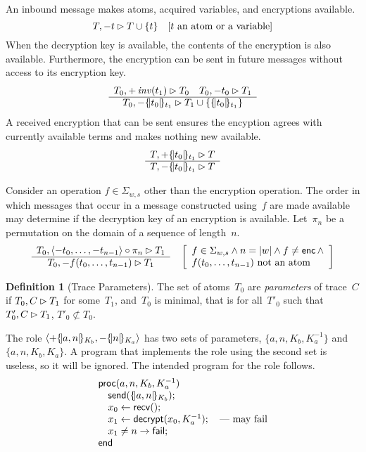 \documentclass[12pt]{article}
\theoremstyle{definition}
\newtheorem{defn}{Definition}[section]
\begin{document}
An inbound message makes atoms, acquired variables, and
encryptions available.
$$T,-t\rhd T\cup\{t\}\quad [\mbox{$t$ an atom or a variable}]$$
When the decryption key is available, the contents of the encryption
is also available.  Furthermore, the encryption can be sent in future
messages without access to its encryption key.
$$\begin{array}{c}T_0,+\operatorname{\mathit{inv}}(t_1)\rhd T_0\quad
  T_0,-t_0\rhd T_1\\\hline\relax
  T_0,-\{\!|t_0|\!\}_{t_1}\rhd T_1\cup\{\{\!|t_0|\!\}_{t_1}\}\end{array}$$ A received
encryption that can be sent ensures the encyption agrees with
currently available terms and makes nothing new available.
$$\begin{array}{c}T,+\{\!|t_0|\!\}_{t_1}\rhd T\\\hline\relax
  T,-\{\!|t_0|\!\}_{t_1}\rhd T\end{array}$$

Consider an operation $f\in\Sigma_{w,s}$ other than the encryption
operation.  The order in which messages that occur in a message
constructed using~$f$ are made available may determine if the
decryption key of an encryption is available.  Let~$\pi_n$ be a
permutation on the domain of a sequence of length~$n$.
$$\infer{\flow{T_0}{\seq{-t_0,\ldots,-t_{n-1}}\circ\pi_n}{T_1}}%
{\flow{T_0}{-f(t_0,\ldots,t_{n-1})}{T_1}}\quad
\left[\begin{array}{l}
f\in\Sigma_{w,s}\land n=|w|\land f\neq\cn{enc}\land {}\\
\mbox{$f(t_0,\ldots,t_{n-1})$ not an atom}
\end{array}\right]$$

\begin{defn}[Trace Parameters]
The set of atoms~$T_0$ are \emph{parameters} of trace~$C$ if
$T_0,C\rhd T_1$ for some~$T_1$, and~$T_0$ is minimal, that is for
all~$T'_0$ such that $T'_0,C\rhd T_1$, $T'_0\not\subset T_0$.
\end{defn}

The role $\langle\mathord +\{\!|a,n|\!\}_{K_b},\mathord -\{\!|n|\!\}_{K_a}\rangle$ has
two sets of parameters, $\{a,n,K_b,K^{-1}_a\}$
and $\{a,n,K_b,K_a\}$.  A program that implements the role using the
second set is useless, so it will be ignored.  The intended program
for the role follows.
$$\begin{array}{ll}
\operatorname{\mathsf{proc}}(a,n,K_b,K^{-1}_a)\\
\quad \operatorname{\mathsf{send}}(\{\!|a,n|\!\}_{K_b});\\
\quad x_0\gets \operatorname{\mathsf{recv}}();\\
\quad x_1\gets \operatorname{\mathsf{decrypt}}(x_0,K^{-1}_a);\quad\mbox{--- may fail}\\
\quad x_1 \neq n \to \operatorname{\mathsf{fail}};\\
\operatorname{\mathsf{end}}
\end{array}$$
\end{document}
